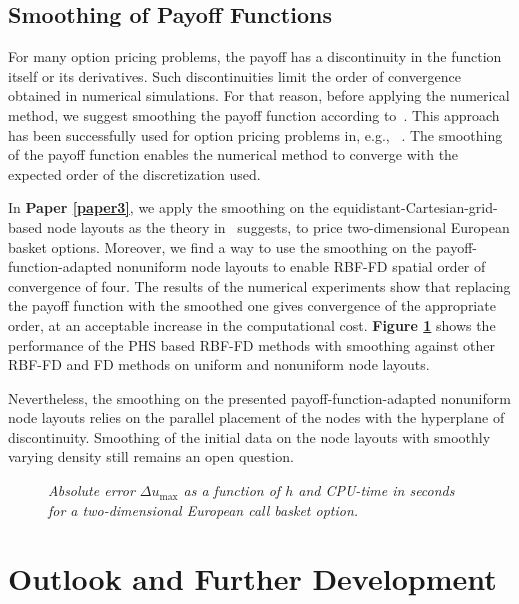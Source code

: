 \documentclass{UUThesisTemplate}
\begin{document}
%
\section{Smoothing of Payoff Functions}

\par
For many option pricing problems, the payoff has a discontinuity in the function itself or its derivatives. Such discontinuities limit the order of convergence obtained in numerical simulations. For that reason, before applying the numerical method, we suggest smoothing the payoff function according to~\cite{kreiss1970smoothing}. This approach has been successfully used for option pricing problems in, e.g., ~\cite{pooley2003convergence, during2015high}. The smoothing of the payoff function enables the numerical method to converge with the expected order of the discretization used. 

\par
In \textbf{Paper \ref{paper3}}, we apply the smoothing on the equidistant-Cartesian-grid-based node layouts as the theory in~\cite{kreiss1970smoothing} suggests, to price two-dimensional European basket options. Moreover, we find a way to use the smoothing on the payoff-function-adapted nonuniform node layouts to enable RBF-FD spatial order of convergence of four. The results of the numerical experiments show that replacing the payoff function with the smoothed one gives convergence of the appropriate order, at an acceptable increase in the computational cost. \textbf{Figure \ref{fig:smoothing}} shows the performance of the PHS based RBF-FD methods with smoothing against other RBF-FD and FD methods on uniform and nonuniform node layouts. 

\par
Nevertheless, the smoothing on the presented payoff-function-adapted nonuniform node layouts relies on the parallel placement of the nodes with the hyperplane of discontinuity. Smoothing of the initial data on the node layouts with smoothly varying density still remains an open question. 
\begin{figure}[H]
\centering
\hspace{11pt}

\caption{\emph{Absolute error $\Delta u_{\max}$ as a function of $h$ and CPU-time in seconds for a two-dimensional European call basket option.}}
\label{fig:smoothing}
\end{figure}



%
\chapter{Outlook and Further Development}
\label{ch:outlook}
\end{document}
